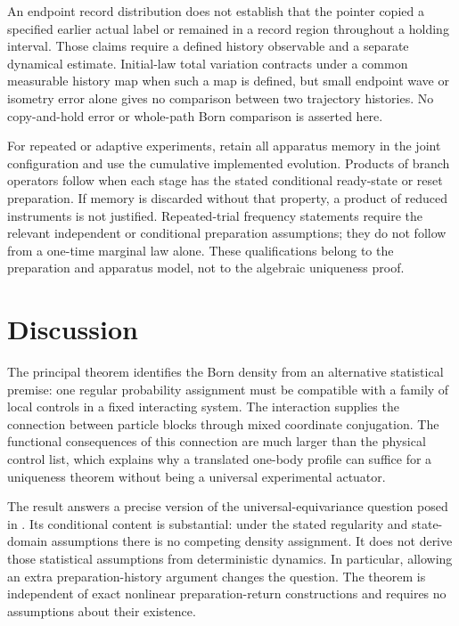 \documentclass[11pt]{article}
\numberwithin{equation}{section}
\theoremstyle{definition}
\begin{document}
An endpoint record distribution does not establish that the pointer copied a specified earlier actual label or remained in a record region throughout a holding interval. Those claims require a defined history observable and a separate dynamical estimate. Initial-law total variation contracts under a common measurable history map when such a map is defined, but small endpoint wave or isometry error alone gives no comparison between two trajectory histories. No copy-and-hold error or whole-path Born comparison is asserted here.

For repeated or adaptive experiments, retain all apparatus memory in the joint configuration and use the cumulative implemented evolution. Products of branch operators follow when each stage has the stated conditional ready-state or reset preparation. If memory is discarded without that property, a product of reduced instruments is not justified. Repeated-trial frequency statements require the relevant independent or conditional preparation assumptions; they do not follow from a one-time marginal law alone. These qualifications belong to the preparation and apparatus model, not to the algebraic uniqueness proof.

\section{Discussion}

The principal theorem identifies the Born density from an alternative statistical premise: one regular probability assignment must be compatible with a family of local controls in a fixed interacting system. The interaction supplies the connection between particle blocks through mixed coordinate conjugation. The functional consequences of this connection are much larger than the physical control list, which explains why a translated one-body profile can suffice for a uniqueness theorem without being a universal experimental actuator.

The result answers a precise version of the universal-equivariance question posed in \cite{GS2007}. Its conditional content is substantial: under the stated regularity and state-domain assumptions there is no competing density assignment. It does not derive those statistical assumptions from deterministic dynamics. In particular, allowing an extra preparation-history argument changes the question. The theorem is independent of exact nonlinear preparation-return constructions and requires no assumptions about their existence.
\end{document}
